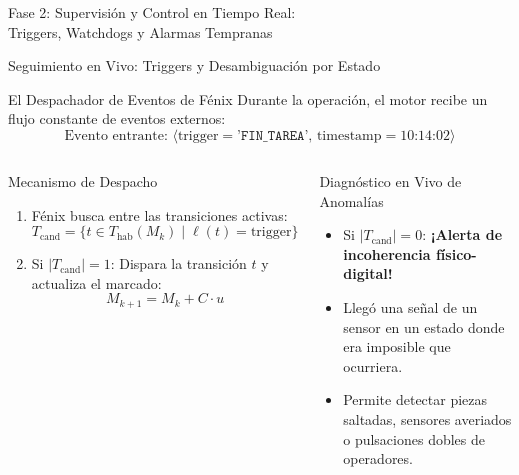 \documentclass[10pt, aspectratio=169]{beamer}
\begin{document}
\begin{frame}{}
	\centering
	\Huge{Fase 2: Supervisión y Control en Tiempo Real: \\ Triggers, Watchdogs y Alarmas Tempranas}
\end{frame}

\begin{frame}{Seguimiento en Vivo: Triggers y Desambiguación por Estado}
	\begin{block}{El Despachador de Eventos de Fénix}
		Durante la operación, el motor recibe un flujo constante de eventos externos:
		\[ \text{Evento entrante: } \langle \text{trigger} = \texttt{'FIN\_TAREA'}, \, \text{timestamp} = 10\text{:}14\text{:}02 \rangle \]
	\end{block}

	\begin{columns}
		\begin{block}{Mecanismo de Despacho}
			\begin{enumerate}
				\item Fénix busca entre las transiciones activas:
				\[ T_{\text{cand}} = \{ t \in T_{\text{hab}}(M_k) \mid \ell(t) = \text{trigger} \} \]
				\item Si $|T_{\text{cand}}| = 1$: Dispara la transición $t$ y actualiza el marcado:
				\[ M_{k+1} = M_k + C \cdot u \]
			\end{enumerate}
		\end{block}

		\begin{alertblock}{Diagnóstico en Vivo de Anomalías}
			\begin{itemize}
				\item Si $|T_{\text{cand}}| = 0$: \textbf{¡Alerta de incoherencia físico-digital!}
				\item Llegó una señal de un sensor en un estado donde era imposible que ocurriera.
				\item Permite detectar piezas saltadas, sensores averiados o pulsaciones dobles de operadores.
			\end{itemize}
		\end{alertblock}
	\end{columns}
\end{frame}
\end{document}
